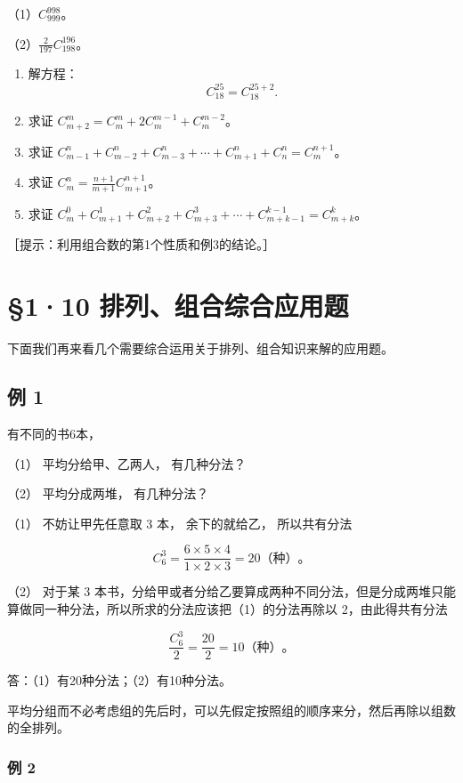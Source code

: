 （1）\(C_{999}^{998}\)。

（2）\(\frac{2}{197}C_{198}^{196}\)。

\begin{enumerate}[start=2]
\item
  解方程：
\[
C _ {18} ^ {25} = C _ {18} ^ {25 + 2}.
\]
\item
  求证 \(C_{m+2}^{m} = C_{m}^{m} + 2C_{m}^{m-1} + C_{m}^{m-2}\)。
\item
  求证
  \(C_{m-1}^{n} + C_{m-2}^{n} + C_{m-3}^{n} + \cdots + C_{m+1}^{n} + C_{n}^{n} = C_{m}^{n+1}\)。
\item
  求证 \(C_{m}^{n} = \frac{n + 1}{m + 1} C_{m + 1}^{n + 1}\)。
\item
  求证
  \(C_m^0+C_{m+1}^1+C_{m+2}^2+C_{m+3}^3+\cdots+C_{m+k-1}^{k-1}=C_{m+k}^{k}\)。
\end{enumerate}

［提示：利用组合数的第1个性质和例3的结论。］

\section{§1·10 排列、组合综合应用题}

下面我们再来看几个需要综合运用关于排列、组合知识来解的应用题。

\subsection{例 1}

有不同的书6本，

（1） 平均分给甲、乙两人， 有几种分法？

（2） 平均分成两堆， 有几种分法？

 （1） 不妨让甲先任意取 3 本， 余下的就给乙，
所以共有分法

\[
C_6^3=\frac{6\times5\times4}{1\times2\times3}=20\text{（种）}\text{。}
\]

（2） 对于某 3
本书，分给甲或者分给乙要算成两种不同分法，但是分成两堆只能算做同一种分法，所以所求的分法应该把（1）的分法再除以
2，由此得共有分法

\[
\frac{C_6^3}{2}=\frac{20}{2}=10\text{（种）}\text{。}
\]

答：（1）有20种分法；（2）有10种分法。

平均分组而不必考虑组的先后时，可以先假定按照组的顺序来分，然后再除以组数的全排列。

\subsubsection{例 2}

